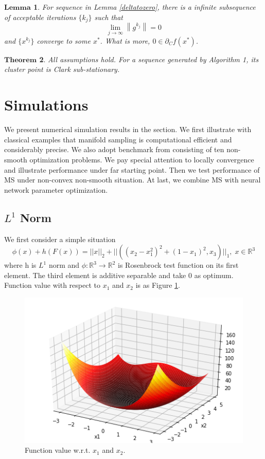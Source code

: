 \documentclass[10pt, oneside]{article}
\newtheorem{thm}{$\mathbf{Theorem}$}[section]
\newtheorem{lem}[thm]{$\mathbf{Lemma}$}
\begin{document}
\begin{lem}
\label{substationary}
For sequence in Lemma \ref{deltatozero}, there is a infinite subsequence of acceptable iterations $\{k_j\}$ such that 
$$
\lim _{j \rightarrow \infty}\left\|g^{k_{j}}\right\|=0
$$
and $\{x^{k_j}\}$ converge to some $x^*$. What is more, $0\in \partial_Cf(x^*)$.
\end{lem}


\begin{thm}
\label{mainthm}
All assumptions hold. For a sequence generated by Algorithm 1, its cluster point is Clark sub-stationary. 
\end{thm}

\section{Simulations}
We present numerical simulation results in the section. We first illustrate with classical examples that manifold sampling is computational efficient and considerably precise. We also adopt benchmark from \cite{benchmark} consisting of ten non-smooth optimization problems. We pay special attention to locally convergence and illustrate performance under far starting point. Then we test performance of MS under non-convex non-smooth situation. At last, we combine MS with neural network parameter optimization. 
\subsection{$L^1$ Norm}
We first consider a simple situation
\begin{equation}
\label{testfunc1}
\phi(x)+h(F(x))=||x||_2+||((x_2-x_1^2)^2+(1-x_1)^2,x_3)||_1,\;x\in \mathbb{R}^3
\end{equation}
where h is $L^1$ norm and $\phi : \mathbb{R}^3 \to \mathbb{R}^2 $ is Rosenbrock test function on its first element. The third element is additive separable and take 0 as optimum. Function value with respect to $x_1$ and $x_2$ is as Figure \ref{fig:function}.

\begin{figure}[h]
\centering
\includegraphics[scale=.6]{figure/function.png}
\caption{Function value w.r.t. $x_1$ and $x_2$.}
\label{fig:function}
\end{figure} 
\end{document}
